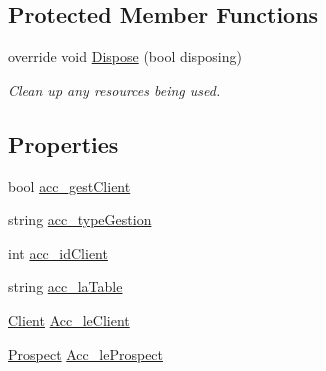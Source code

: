 \subsection*{Protected Member Functions}
\begin{DoxyCompactItemize}
\item 
override void \mbox{\hyperlink{class_d_b___projet___active_1_1_formulaire_aa49cc659c830735a21144b79b9b1a30f}{Dispose}} (bool disposing)
\begin{DoxyCompactList}\small\item\em Clean up any resources being used. \end{DoxyCompactList}\end{DoxyCompactItemize}
\subsection*{Properties}
\begin{DoxyCompactItemize}
\item 
bool \mbox{\hyperlink{class_d_b___projet___active_1_1_formulaire_a19eb646efbcaa6895cbc83cbcfde1fa5}{acc\+\_\+gest\+Client}}
\item 
string \mbox{\hyperlink{class_d_b___projet___active_1_1_formulaire_a8bb489732412ac845958fb663f031923}{acc\+\_\+type\+Gestion}}
\item 
int \mbox{\hyperlink{class_d_b___projet___active_1_1_formulaire_abc5da09161c4a7c8bb01e12c03aff981}{acc\+\_\+id\+Client}}
\item 
string \mbox{\hyperlink{class_d_b___projet___active_1_1_formulaire_a7617cece0adba1ceb7697148e54291de}{acc\+\_\+la\+Table}}
\item 
\mbox{\hyperlink{class_d_b___projet___active_1_1_client}{Client}} \mbox{\hyperlink{class_d_b___projet___active_1_1_formulaire_ae6325ff17a2e95e7072dec4d36597e72}{Acc\+\_\+le\+Client}}
\item 
\mbox{\hyperlink{class_d_b___projet___active_1_1_prospect}{Prospect}} \mbox{\hyperlink{class_d_b___projet___active_1_1_formulaire_a35eb89282c0e659dd8eeaf9ffed601a0}{Acc\+\_\+le\+Prospect}}
\end{DoxyCompactItemize}


